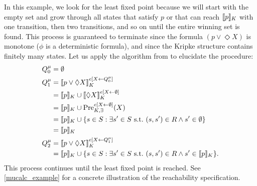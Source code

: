 \begin{enumerate}[label = (\roman*)]
        In this example, we look for the least fixed point because we will start with the empty set and grow through all states that satisfy $p$ or that can reach $\brackets{p}_K$ with one transition, then two transitions, and so on until the entire winning set is found. This process is guaranteed to terminate since the formula $(p \lor \Diamond X)$ is monotone ($\phi$ is a deterministic \mucalc{} formula), and since the Kripke structure contains finitely many states. Let us apply the algorithm from  to elucidate the procedure:
        \begin{align*}
            Q_0^\mu &= \emptyset \\
            Q_1^\mu &= \brackets{p \lor \Diamond X}_K^{e[X \leftarrow Q_0^\mu]} \\
                    &= \brackets{p}_K \cup \brackets{\Diamond X}_K^{e[X \leftarrow \emptyset]}\\
                    &= \brackets{p}_K \cup \Pree[{e[X \leftarrow \emptyset]}]{X} \\
                    &= \brackets{p}_K \cup \{ s \in S : \exists s' \in S \ \text{s.t.} \ (s,s') \in R   \land s' \in \emptyset \} \\
                    &= \brackets{p}_K\\
            Q_2^\mu &= \brackets{p \lor \Diamond X}_K^{e[X \leftarrow Q_1^\mu]} \\
                    &= \brackets{p}_K \cup \{ s \in S : \exists s' \in S \ \text{s.t.} \ (s,s') \in R \land s' \in \brackets{p}_K \}.
        \end{align*}
        This process continues until the least fixed point is reached. See \autoref{mucalc_example} for a concrete illustration of the reachability specification.


\end{enumerate}
